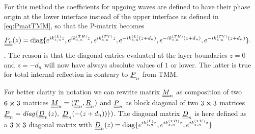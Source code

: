 For this method the coefficients for upgoing waves are defined to have their
phase origin at the lower interface instead of the upper interface as defined
in \ref{eq:PmatTMM}, so that the P-matrix becomes
\begin{equation}
    \underline{\underline{P_n}}(z) = \text{diag}\{ e^{ik_{z,n}^{(L)}z},
    e^{ik_{z,n}^{(TH)}z},
    e^{ik_{z,n}^{(TV)}z}, e^{-ik_{z,n}^{(L)}(z+d_n)},
    e^{-ik_{z,n}^{(TH)}(z+d_n)},
    e^{-ik_{z,n}^{(TV)}(z+d_n)}\}.
\end{equation}.
The reason is that the diagonal entries evaluated at the layer boundaries $z=0$
and $z=-d_n$ will now have always absolute values of $1$ or lower. The latter
is true for total internal reflection in contrary to $\underline{\underline{P}}_n$ from TMM.

For better clarity in notation we can rewrite matrix $\underline{\underline{M}}_n$ as
composition of two $6\cross 3$ matrices $\underline{\underline{M}}_n = (\underline{\underline{T}}_n,
    \underline{\underline{R}}_n)$ and $\underline{\underline{P}}_n$ as block diagonal of two $3\cross 3$
matrices $\underline{\underline{P}}_n = \mathit{diag}\{\underline{\underline{D}}_n(z),\
    \underline{\underline{D}}_n(-(z+d_n))
    \})$. The diagonal matrix $\underline{\underline{D}}_n$ is here defined as a $3\cross3$
diagonal matrix with $\underline{\underline{D}}_n(z) = \text{diag}\{ e^{ik_{z,n}^{(L)}z},
    e^{ik_{z,n}^{(TH)}z}, e^{ik_{z,n}^{(TV)}z}\}$

